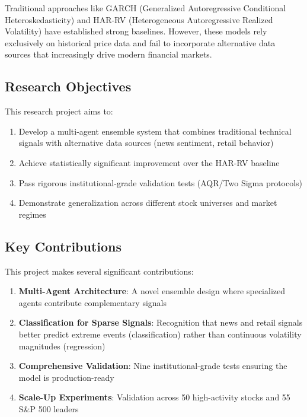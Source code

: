\documentclass[12pt,a4paper]{article}
\begin{document}
Traditional approaches like GARCH (Generalized Autoregressive Conditional Heteroskedasticity) and HAR-RV (Heterogeneous Autoregressive Realized Volatility) have established strong baselines. However, these models rely exclusively on historical price data and fail to incorporate alternative data sources that increasingly drive modern financial markets.

\subsection{Research Objectives}

This research project aims to:

\begin{enumerate}
    \item Develop a multi-agent ensemble system that combines traditional technical signals with alternative data sources (news sentiment, retail behavior)
    \item Achieve statistically significant improvement over the HAR-RV baseline
    \item Pass rigorous institutional-grade validation tests (AQR/Two Sigma protocols)
    \item Demonstrate generalization across different stock universes and market regimes
\end{enumerate}

\subsection{Key Contributions}

This project makes several significant contributions:

\begin{enumerate}
    \item \textbf{Multi-Agent Architecture}: A novel ensemble design where specialized agents contribute complementary signals
    \item \textbf{Classification for Sparse Signals}: Recognition that news and retail signals better predict extreme events (classification) rather than continuous volatility magnitudes (regression)
    \item \textbf{Comprehensive Validation}: Nine institutional-grade tests ensuring the model is production-ready
    \item \textbf{Scale-Up Experiments}: Validation across 50 high-activity stocks and 55 S\&P 500 leaders
\end{enumerate}
\end{document}
